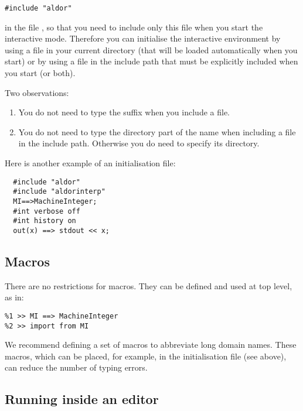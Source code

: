 {\small
\begin{verbatim}
#include "aldor"
\end{verbatim}
}


in the file , so that you need to include only this
file when you start the interactive mode.
Therefore you can initialise the interactive environment by using a file
 in your current directory (that will be loaded
automatically when you start) or by using a file in the include path
that must be explicitly included when you start (or both).

\goodbreak
Two observations: 
\begin{enumerate}

\item You do not need to type the  suffix when you include
a file.

\item You do not need to type the directory part of the name
when including a file in the include path.
Otherwise you do need to specify its directory.

\end{enumerate}

Here is another example of an initialisation file:

{\small
\begin{verbatim}
  #include "aldor"
  #include "aldorinterp"
  MI==>MachineInteger;
  #int verbose off
  #int history on
  out(x) ==> stdout << x;
\end{verbatim}
}

\subsection{Macros}

There are no restrictions for macros. They can be defined and used
at top level, as in:
 {\small
\begin{verbatim}
%1 >> MI ==> MachineInteger
%2 >> import from MI
\end{verbatim}
}

We recommend defining a set of macros to abbreviate long domain
names. These macros, which can be placed, for example, in the
initialisation file (see above), can reduce the number of typing errors.

\subsection{Running inside an editor}

